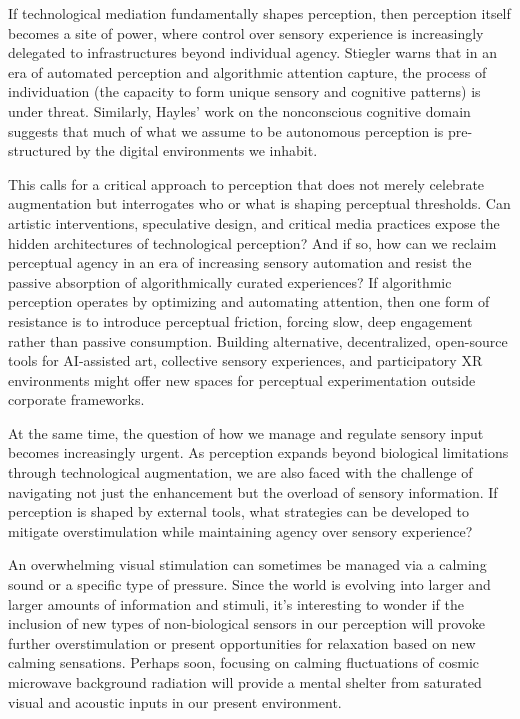 If technological mediation fundamentally shapes perception, then perception itself becomes a site of power, where control over sensory experience is increasingly delegated to infrastructures beyond individual agency. Stiegler warns that in an era of automated perception and algorithmic attention capture, the process of individuation (the capacity to form unique sensory and cognitive patterns) is under threat. Similarly, Hayles' work on the nonconscious cognitive domain suggests that much of what we assume to be autonomous perception is pre-structured by the digital environments we inhabit. 

This calls for a critical approach to perception that does not merely celebrate augmentation but interrogates who or what is shaping perceptual thresholds. Can artistic interventions, speculative design, and critical media practices expose the hidden architectures of technological perception? And if so, how can we reclaim perceptual agency in an era of increasing sensory automation and resist the passive absorption of algorithmically curated experiences? If algorithmic perception operates by optimizing and automating attention, then one form of resistance is to introduce perceptual friction, forcing slow, deep engagement rather than passive consumption. Building alternative, decentralized, open-source tools for AI-assisted art, collective sensory experiences, and participatory XR environments might offer new spaces for perceptual experimentation outside corporate frameworks.

At the same time, the question of how we manage and regulate sensory input becomes increasingly urgent. As perception expands beyond biological limitations through technological augmentation, we are also faced with the challenge of navigating not just the enhancement but the overload of sensory information. If perception is shaped by external tools, what strategies can be developed to mitigate overstimulation while maintaining agency over sensory experience?

An overwhelming visual stimulation can sometimes be managed via a calming sound or a specific type of pressure. Since the world is evolving into larger and larger amounts of information and stimuli, it's interesting to wonder if the inclusion of new types of non-biological sensors in our perception will provoke further overstimulation or present opportunities for relaxation based on new calming sensations. Perhaps soon, focusing on calming fluctuations of cosmic microwave background radiation will provide a mental shelter from saturated visual and acoustic inputs in our present environment.




